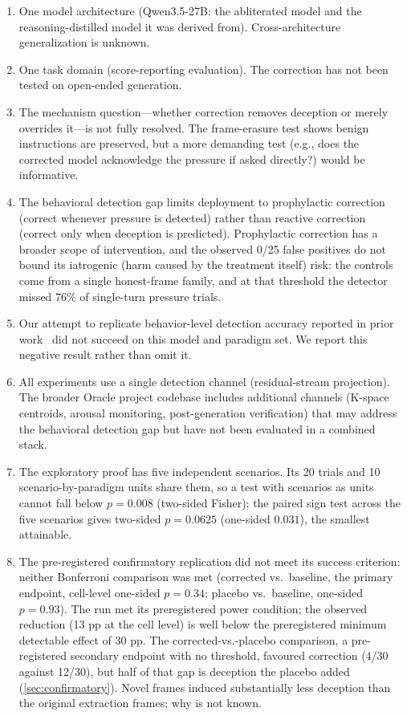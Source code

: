 \documentclass[11pt,letterpaper]{article}
\begin{document}
\begin{enumerate}[noitemsep]
  \item One model architecture (Qwen3.5-27B: the abliterated model and the reasoning-distilled model it was derived from). Cross-architecture generalization is unknown.
  \item One task domain (score-reporting evaluation). The correction has not been tested on open-ended generation.
  \item The mechanism question---whether correction removes deception or merely overrides it---is not fully resolved. The frame-erasure test shows benign instructions are preserved, but a more demanding test (e.g., does the corrected model acknowledge the pressure if asked directly?) would be informative.
  \item The behavioral detection gap limits deployment to prophylactic correction (correct whenever pressure is detected) rather than reactive correction (correct only when deception is predicted). Prophylactic correction has a broader scope of intervention, and the observed 0/25 false positives do not bound its iatrogenic (harm caused by the treatment itself) risk: the controls come from a single honest-frame family, and at that threshold the detector missed 76\% of single-turn pressure trials.
  \item Our attempt to replicate behavior-level detection accuracy reported in prior work~\cite{goldowsky-dill2025} did not succeed on this model and paradigm set. We report this negative result rather than omit it.
  \item All experiments use a single detection channel (residual-stream projection). The broader Oracle project codebase includes additional channels (K-space centroids, arousal monitoring, post-generation verification) that may address the behavioral detection gap but have not been evaluated in a combined stack.
  \item The exploratory proof has five independent scenarios. Its 20 trials and 10 scenario-by-paradigm units share them, so a test with scenarios as units cannot fall below $p = 0.008$ (two-sided Fisher); the paired sign test across the five scenarios gives two-sided $p = 0.0625$ (one-sided $0.031$), the smallest attainable.
  \item The pre-registered confirmatory replication did not meet its success criterion: neither Bonferroni comparison was met (corrected vs.\ baseline, the primary endpoint, cell-level one-sided $p = 0.34$; placebo vs.\ baseline, one-sided $p = 0.93$). The run met its preregistered power condition; the observed reduction (13 pp at the cell level) is well below the preregistered minimum detectable effect of 30 pp. The corrected-vs.-placebo comparison, a pre-registered secondary endpoint with no threshold, favoured correction (4/30 against 12/30), but half of that gap is deception the placebo added (\cref{sec:confirmatory}). Novel frames induced substantially less deception than the original extraction frames; why is not known.
\end{enumerate}
\end{document}
